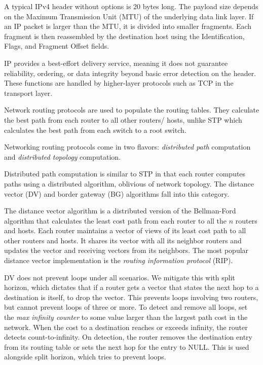 A typical IPv4 header without options is 20 bytes long.
The payload size depends on the Maximum Transmission Unit
(MTU) of the underlying data link layer. If an IP packet
is larger than the MTU, it is divided into smaller fragments.
Each fragment is then reassembled by the destination host
using the Identification, Flags, and Fragment Offset fields.

IP provides a best-effort delivery service, meaning it does
not guarantee reliability, ordering, or data integrity beyond
basic error detection on the header. These functions are
handled by higher-layer protocols such as TCP in the transport layer.

Network routing protocols are used to populate the routing tables.
They calculate the best path from each router to all other routers/
hosts, unlike STP which calculates the best path from each switch
to a root switch.

Networking routing protocols come in two flavors: \emph{distributed path}
computation and \emph{distributed topology} computation.

Distributed path computation is similar to STP in that each router computes paths
using a distributed algorithm, oblivious of network topology. The distance vector (DV)
and border gateway (BG) algorithms fall into this category.

The distance vector algorithm is a distributed version of the Bellman-Ford algorithm that
calculates the least cost path from each router to all the $n$ routers and hosts.
Each router maintains a vector of views of its least cost path to all other routers and
hosts. It shares its vector with all its neighbor routers and updates the vector and
receiving vectors from its neighbors.
The most popular distance vector implementation is the \emph{routing information protocol}
(RIP).

DV does not prevent loops under all scenarios. We mitigate this with
split horizon, which dictates that if a router gets a vector that states
the next hop to a destination is itself, to drop the vector. This prevents
loops involving two routers, but cannot prevent loops of three or more.
To detect and remove all loops, set the \emph{max infinity counter} to
some value larger than the largest path cost in the network. When the cost
to a destination reaches or exceeds infinity, the router detects count-to-infinity.
On detection, the router removes the destination entry from its routing
table or sets the next hop for the entry to NULL. This is used alongside
split horizon, which tries to prevent loops.

